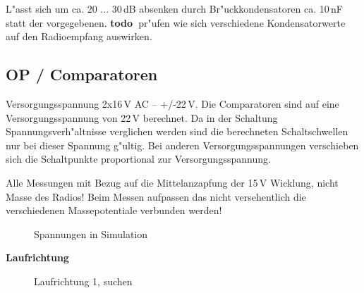 \documentclass[ngerman,11pt,parskip=half] {scrartcl}
\newcommand {\todo} {\textbf{\color{red} todo\ }}
\newcommand {\tscopesize}{12cm}
\begin{document}
L"asst sich um ca. 20 ... 30\,dB absenken durch Br"uckkondensatoren ca. 10\,nF statt der vorgegebenen. \todo pr"ufen wie sich verschiedene Kondensatorwerte auf den Radioempfang auswirken.

\subsection{OP / Comparatoren} \label{sec:inbetriebnahme:op-cmp}

Versorgungsspannung 2x16\,V AC -- +/-22\,V. Die Comparatoren sind auf eine Versorgungsspannung von 22\,V berechnet. Da in der Schaltung Spannungsverh"altnisse verglichen werden sind die berechneten Schaltschwellen nur bei dieser Spannung g"ultig. Bei anderen Versorgungsspannungen verschieben sich die Schaltpunkte proportional zur Versorgungsspannung.

Alle Messungen mit Bezug auf die Mittelanzapfung der 15\,V Wicklung, nicht Masse des Radios! Beim Messen aufpassen das nicht versehentlich die verschiedenen Massepotentiale verbunden werden!

\begin{figure}[H]
\centering
{}
\caption{Spannungen in Simulation} \label{fig:1}
\end{figure}

\textbf{Laufrichtung}

\begin{figure}[H]
\centering
{}
\caption{Laufrichtung 1, suchen} \label{fig:1}
\end{figure}
\end{document}
